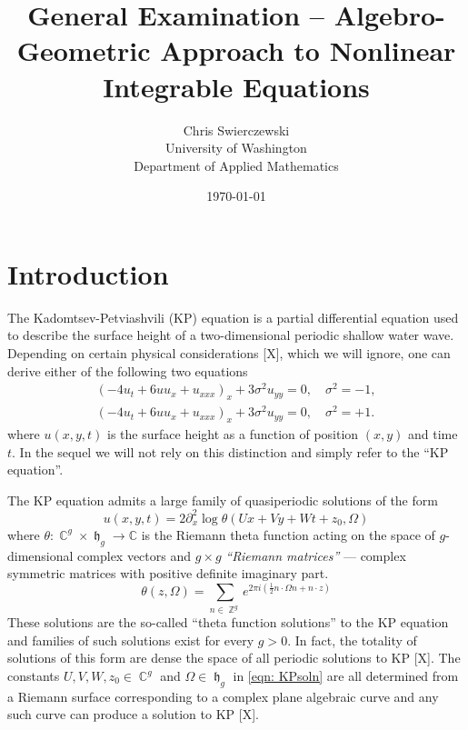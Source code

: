 \documentclass{article}
\title{General Examination -- Algebro-Geometric
  Approach to Nonlinear Integrable Equations}
\author{
Chris Swierczewski\\
University of Washington\\
Department of Applied Mathematics}
\date{\today}
\DeclareMathOperator{\ZZ}{\mathbb{Z}}
\DeclareMathOperator{\CC}{\mathbb{C}}
\DeclareMathOperator{\hh}{\mathfrak{h}}
\begin{document}

\maketitle

\section{Introduction}

The Kadomtsev-Petviashvili (KP) equation is a partial differential
equation used to describe the surface height of a two-dimensional
periodic shallow water wave. Depending on certain physical
considerations [X], which we will ignore, one can derive either of
the following two equations
\begin{align}
  \left(-4u_t + 6uu_x + u_{xxx}\right)_x + 3\sigma^2 u_{yy} = 0, \quad
  \sigma^2 = -1, \label{eqn: KP1} \\
  \left(-4u_t + 6uu_x + u_{xxx}\right)_x + 3\sigma^2 u_{yy} = 0, \quad
  \sigma^2 = +1. \label{eqn: KP2}
\end{align}
where $u(x,y,t)$ is the surface height as a function of position $(x,y)$
and time $t$. In the sequel we will not rely on this distinction and
simply refer to the ``KP equation''.

The KP equation admits a large family of quasiperiodic solutions of the
form
\begin{equation} \label{eqn: KPsoln}
  u(x,y,t) = 2 \partial_x^2 \log \theta(Ux+Vy+Wt+z_0, \Omega)
\end{equation}
where $\theta : \CC^g \times \hh_g \to \mathbb{C}$ is the Riemann theta
function acting on the space of $g$-dimensional complex vectors and $g
\times g$ {\it ``Riemann matrices''} --- complex symmetric matrices
with positive definite imaginary part.
\begin{equation} \label{eqn: RiemannTheta}
  \theta(z,\Omega) = \sum_{n \in \ZZ^g}
  e^{2 \pi i \left( \tfrac{1}{2} n \cdot \Omega n + n \cdot z \right)}
\end{equation}
These solutions are the so-called ``theta function solutions'' to the KP
equation and families of such solutions exist for every $g > 0$. In
fact, the totality of solutions of this form are dense the space of all
periodic solutions to KP [X]. The constants $U,V,W,z_0 \in \CC^g$ and
$\Omega \in \hh_g$ in \eqref{eqn: KPsoln} are all determined from a
Riemann surface corresponding to a complex plane algebraic curve and any
such curve can produce a solution to KP [X].
\end{document}
